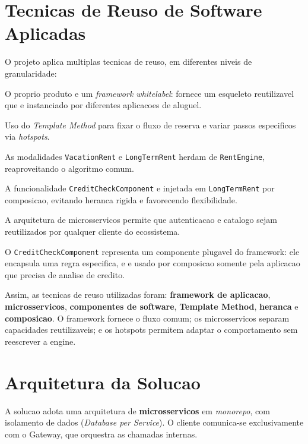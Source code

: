 \documentclass[12pt,a4paper]{article}
\begin{document}
\section{Tecnicas de Reuso de Software Aplicadas}
O projeto aplica multiplas tecnicas de reuso, em diferentes niveis de granularidade:

\begin{description}[leftmargin=1.5cm]
    \item[Frameworks de Aplicacao] O proprio produto e um \textit{framework whitelabel}:
    fornece um esqueleto reutilizavel que e instanciado por diferentes aplicacoes de aluguel.
    \item[Padroes de Projeto] Uso do \textit{Template Method} para fixar o fluxo de
    reserva e variar passos especificos via \textit{hotspots}.
    \item[Reuso por Heranca] As modalidades \texttt{VacationRent} e \texttt{LongTermRent}
    herdam de \texttt{RentEngine}, reaproveitando o algoritmo comum.
    \item[Reuso por Composicao] A funcionalidade \texttt{CreditCheckComponent} e injetada
    em \texttt{LongTermRent} por composicao, evitando heranca rigida e favorecendo flexibilidade.
    \item[Reuso de Servicos (SOA)] A arquitetura de microsservicos permite que
    autenticacao e catalogo sejam reutilizados por qualquer cliente do ecossistema.
    \item[Componentes de Software] O \texttt{CreditCheckComponent} representa um
    componente plugavel do framework: ele encapsula uma regra especifica, e e usado por
    composicao somente pela aplicacao que precisa de analise de credito.
\end{description}

Assim, as tecnicas de reuso utilizadas foram: \textbf{framework de aplicacao},
\textbf{microsservicos}, \textbf{componentes de software}, \textbf{Template Method},
\textbf{heranca} e \textbf{composicao}. O framework fornece o fluxo comum; os
microsservicos separam capacidades reutilizaveis; e os hotspots permitem adaptar o
comportamento sem reescrever a engine.

\section{Arquitetura da Solucao}
A solucao adota uma arquitetura de \textbf{microsservicos} em \textit{monorepo},
com isolamento de dados (\textit{Database per Service}). O cliente comunica-se
exclusivamente com o Gateway, que orquestra as chamadas internas.
\end{document}
